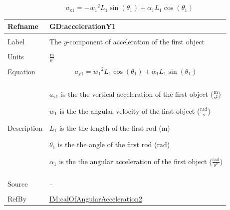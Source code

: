 \documentclass[12pt]{article}
\begin{document}
\begin{displaymath}
{a_{\text{x}1}}=-{w_{1}}^{2} {L_{1}} \sin\left({θ_{1}}\right)+{α_{1}} {L_{1}} \cos\left({θ_{1}}\right)
\end{displaymath}
\vspace{\baselineskip}
\noindent
\begin{minipage}{\textwidth}
\begin{tabular}{>{\raggedright}p{}>{\raggedright\arraybackslash}p{}}
\toprule \textbf{Refname} & \textbf{GD:accelerationY1}
\label{GD:accelerationY1}
\\ \midrule \\
Label & The $y$-component of acceleration of the first object
        
\\ \midrule \\
Units & $\frac{\text{m}}{\text{s}^{2}}$
        
\\ \midrule \\
Equation & \begin{displaymath}
           {a_{\text{y}1}}={w_{1}}^{2} {L_{1}} \cos\left({θ_{1}}\right)+{α_{1}} {L_{1}} \sin\left({θ_{1}}\right)
           \end{displaymath}
\\ \midrule \\
Description & \begin{symbDescription}
              \item{${a_{\text{y}1}}$ is the the vertical acceleration of the first object ($\frac{\text{m}}{\text{s}^{2}}$)}
              \item{${w_{1}}$ is the the angular velocity of the first object ($\frac{\text{rad}}{\text{s}}$)}
              \item{${L_{1}}$ is the the length of the first rod (${\text{m}}$)}
              \item{${θ_{1}}$ is the the angle of the first rod (${\text{rad}}$)}
              \item{${α_{1}}$ is the the angular acceleration of the first object ($\frac{\text{rad}}{\text{s}^{2}}$)}
              \end{symbDescription}
\\ \midrule \\
Source & --
         
\\ \midrule \\
RefBy & \hyperref[IM:calOfAngularAcceleration2]{IM:calOfAngularAcceleration2}
        
\\ \bottomrule
\end{tabular}
\end{minipage}
\end{document}
